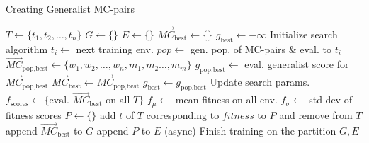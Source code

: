             \begin{algorithm}[H]
            \footnotesize %
            \caption{Creating Generalist MC-pairs}
            \begin{algorithmic}[1] %
                \State $T \gets \{t_1, t_2, \ldots, t_n\}$
                \State $G \gets \{\}$ 
                \State $E \gets \{\}$
                    \State $\overrightarrow{MC}_{\text{best}} \gets \{\}$
                    \State $g_{\text{best}} \gets -\infty$
                    \State Initialize search algorithm
                    \State
                        \State $t_i \gets$ next training env.
                        \State $pop \gets$ gen. pop. of MC-pairs \& eval. to $t_i$
                        \State $\overrightarrow{MC}_{\text{pop,best}} \gets \{w_1, w_2, \ldots, w_n, m_1, m_2 \ldots, m_m\}$
                        \State $g_{\text{pop,best}} \gets$ eval. generalist score for $\overrightarrow{MC}_{\text{pop,best}}$
                            \State $\overrightarrow{MC}_{\text{best}} \gets \overrightarrow{MC}_{\text{pop,best}}$
                            \State $g_{\text{best}} \gets g_{\text{pop,best}}$
                        \EndIf
                        \State Update search params.
                    \EndWhile
                    \State
                    \State $f_{\text{scores}} \gets \{\text{eval. } \overrightarrow{MC}_{\text{best}} \text{ on all } T\}$
                    \State $f_{\mu} \gets$ mean fitness on all env.
                    \State $f_{\sigma} \gets$ std dev of fitness scores
                    \State $P \gets \{\}$
                            \State add $t$ of $T$ corresponding to $fitness$ to $P$ and remove from $T$
                        \EndIf
                    \EndFor
                    \State append $\overrightarrow{MC}_{\text{best}}$ to $G$
                    \State append $P$ to $E$
                    \State (async) Finish training on the partition
                \EndWhile
                \State \Return $G,E$
            \end{algorithmic}
            \end{algorithm}

